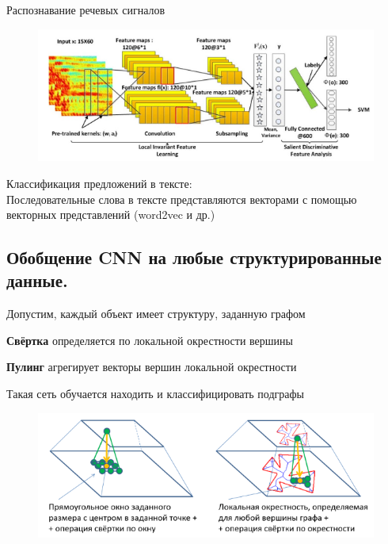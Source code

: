 \begin{description}
	      Распознавание речевых сигналов\\
	      \begin{figure}[h]

		      \centering

		      \includegraphics[width=0.8\linewidth]{chapters/neural/images/pic.png}

		      \label{fig:voice_signals_nn}

	      \end{figure}

	      Классификация предложений в тексте:\\
	      Последовательные слова в тексте представляются векторами с помощью векторных представлений (word2vec и др.)\\

	      \newpage
	      \subsection{Обобщение CNN на любые структурированные данные.}
	      Допустим, каждый объект имеет структуру, заданную графом

	      \textbf{Свёртка} определяется по локальной окрестности вершины

	      \textbf{Пулинг} агрегирует векторы вершин локальной окрестности

	      Такая сеть обучается находить и классифицировать подграфы

	      \begin{figure}[h]

		      \centering

		      \includegraphics[width=0.8\linewidth]{chapters/neural/images/обобщениеCNN.png}


\end{figure}
\end{description}
